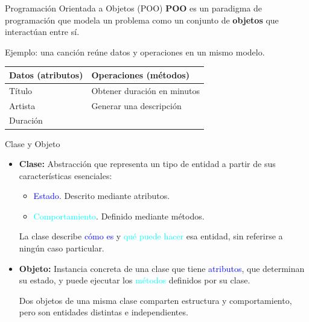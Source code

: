 \documentclass{beamer}
\begin{document}
    \begin{frame}{Programación Orientada a Objetos (POO)}
        \textbf{POO} es un paradigma de programación que modela un problema como un conjunto de \textbf{objetos}
        que interactúan entre sí.
        \pause
        \vspace{0.8em}

        Ejemplo: una canción reúne datos y operaciones en un mismo modelo.
        \renewcommand{\arraystretch}{1.35}
        \begin{center}
            \footnotesize
            \begin{tabular}{@{}p{4.8cm}p{5.2cm}@{}}
                \toprule
                \textbf{Datos (atributos)} & \textbf{Operaciones (métodos)} \\
                \midrule
                Título & Obtener duración en minutos \\
                Artista & Generar una descripción \\
                Duración & \\
                \bottomrule
            \end{tabular}
        \end{center}
    \end{frame}
    
    \begin{frame}{Clase y Objeto}
        \begin{itemize}
            \item \textbf{Clase:} Abstracción que representa un tipo de entidad a partir de sus características esenciales: 
            \begin{itemize}
                \item \textcolor{blue}{Estado}. Descrito mediante atributos.
                \item \textcolor{cyan}{Comportamiento}. Definido mediante métodos. 
            \end{itemize}
            La clase describe \textcolor{blue}{cómo es} y \textcolor{cyan}{qué puede hacer} esa entidad, sin referirse a ningún caso particular.
            \pause
            \item \textbf{Objeto:} Instancia concreta de una clase que tiene \textcolor{blue}{atributos}, 
            que determinan su estado, y puede ejecutar los \textcolor{cyan}{métodos} definidos por su clase.
            \vspace{0.5em}

            Dos objetos de una misma clase comparten estructura y comportamiento, pero son entidades distintas e independientes.
        \end{itemize}
    \end{frame}
\end{document}
